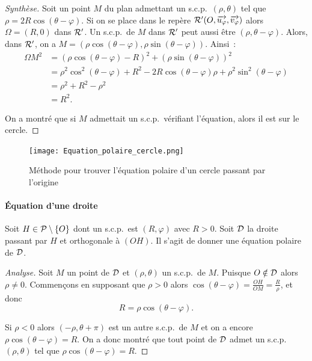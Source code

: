 \begin{proof}[Synthèse]
  Soit un point \(M\) du plan admettant un s.c.p.\ \((\rho , \theta)\) tel que
  \(\rho = 2R\cos(\theta - \varphi)\). Si on se place dans le repère \(\Rep' (O
  , \vect{u_\varphi}, \vect{v_\varphi})\) alors \(\Omega =(R , 0)\) dans
  \(\Rep'\). Un s.c.p.\ de \(M\) dans \(\Rep'\) peut aussi être \((\rho , \theta
  - \varphi)\). Alors, dans \(\Rep'\), on a \(M = (\rho \cos(\theta - \varphi),
  \rho \sin(\theta - \varphi))\). Ainsi~:
  \begin{align}
    {\Omega M}^2& = (\rho\cos(\theta - \varphi)-R)^2 + (\rho\sin(\theta -
    \varphi))^2 \\
                &= \rho^2 \cos^2(\theta - \varphi) + R^2 - 2R\cos(\theta -
                \varphi)\rho + \rho^2 \sin^2(\theta - \varphi) \\
                &= \rho^2 + R^2 - \rho^2\\
                &= R^2.
  \end{align}

  On a montré que si \(M\) admettait un s.c.p.\ vérifiant l'équation, alors il
  est sur le cercle.
\end{proof}

\begin{figure}
  \centering
  \texttt{[image: Equation\_polaire\_cercle.png]}
  \caption{Méthode pour trouver l'équation polaire d'un cercle passant par
  l'origine}
  \label{fig:cerclepolaire}
\end{figure}

\paragraph{Équation d'une droite}
\label{par:eqdroite}

Soit \(H \in \P\setminus\{O\}\) dont un s.c.p.\ est \((R , \varphi)\) avec
\(R>0\). Soit \(\Dr\) la droite passant par \(H\) et orthogonale à \((OH)\). Il
s'agit de donner une équation polaire de \(\Dr\).

\begin{proof}[Analyse]
  Soit \(M\) un point de \(\Dr\) et \((\rho , \theta)\) un s.c.p.\ de \(M\).
  Puisque \(O \notin \Dr\) alors \(\rho \neq 0\). Commençons en supposant que
  \(\rho>0\) alors \(\cos(\theta - \varphi) = \frac{OH}{OM} = \frac{R}{\rho}\),
  et donc
  \begin{equation}
    R = \rho \cos(\theta - \varphi).
  \end{equation}

  Si \(\rho<0\) alors \((-\rho , \theta + \pi)\) est un autre s.c.p.\ de \(M\)
  et on a encore \(\rho\cos(\theta - \varphi) = R\). On a donc montré que tout
  point de \(\Dr\) admet un s.c.p.\ \((\rho, \theta)\) tel que \(\rho\cos(\theta
  - \varphi) = R\).
\end{proof}

